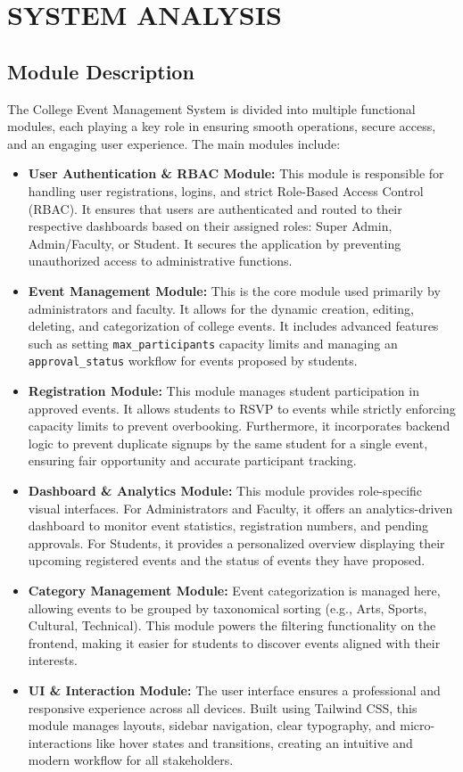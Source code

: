 \chapter{SYSTEM ANALYSIS}
 
 \section{Module Description}
 The College Event Management System is divided into multiple functional modules, each playing a key role in ensuring smooth operations, secure access, and an engaging user experience. The main modules include:
 \begin{itemize}
    \item \textbf{User Authentication \& RBAC Module:} This module is responsible for handling user registrations, logins, and strict Role-Based Access Control (RBAC). It ensures that users are authenticated and routed to their respective dashboards based on their assigned roles: Super Admin, Admin/Faculty, or Student. It secures the application by preventing unauthorized access to administrative functions.
    \item \textbf{Event Management Module:} This is the core module used primarily by administrators and faculty. It allows for the dynamic creation, editing, deleting, and categorization of college events. It includes advanced features such as setting \texttt{max\_participants} capacity limits and managing an \texttt{approval\_status} workflow for events proposed by students.
    \item \textbf{Registration Module:} This module manages student participation in approved events. It allows students to RSVP to events while strictly enforcing capacity limits to prevent overbooking. Furthermore, it incorporates backend logic to prevent duplicate signups by the same student for a single event, ensuring fair opportunity and accurate participant tracking.
    \item \textbf{Dashboard \& Analytics Module:} This module provides role-specific visual interfaces. For Administrators and Faculty, it offers an analytics-driven dashboard to monitor event statistics, registration numbers, and pending approvals. For Students, it provides a personalized overview displaying their upcoming registered events and the status of events they have proposed.
    \item \textbf{Category Management Module:} Event categorization is managed here, allowing events to be grouped by taxonomical sorting (e.g., Arts, Sports, Cultural, Technical). This module powers the filtering functionality on the frontend, making it easier for students to discover events aligned with their interests.
    \item \textbf{UI \& Interaction Module:} The user interface ensures a professional and responsive experience across all devices. Built using Tailwind CSS, this module manages layouts, sidebar navigation, clear typography, and micro-interactions like hover states and transitions, creating an intuitive and modern workflow for all stakeholders.
\end{itemize}

